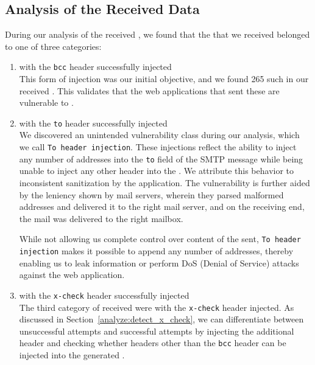 \subsection{Analysis of the Received \Email Data}
During our analysis of the received \emails, we found that the \emails that we received belonged to one of three categories:
\begin{enumerate}
	\item \Emails with the \texttt{bcc} header successfully injected\\
	  This form of injection was our initial objective, and we found
      265 such \emails in our received \emails. This validates that the web applications that sent these \emails are vulnerable to \ehi.
	
	\item \Emails with the \texttt{to} header successfully injected\\
	We discovered an unintended vulnerability class during our analysis, which we call \texttt{To~header injection}. These injections reflect the ability to inject any number of \email addresses into the \texttt{to} field of the SMTP message while being unable to inject any other header into the \emails. We attribute this behavior to inconsistent sanitization by the application. 
	The vulnerability is further aided by the leniency shown by mail servers, wherein they parsed malformed \email addresses and delivered it to the right mail server, and on the receiving end, the mail was delivered to the right mailbox. 
	
	While not allowing us complete control over content of the \emails sent, \texttt{To header injection} makes it possible to append any number of \email addresses, thereby enabling us to leak information or perform DoS (Denial of Service) attacks against the web application.
	
	\item \Emails with the \texttt{x-check} header successfully injected\\
    The third category of \emails received were \emails with the \texttt{x-check} header injected. As discussed in Section~\ref{analyze:detect_x_check}, 
    we can differentiate between unsuccessful attempts and successful attempts by injecting the additional header and checking whether headers other than the \texttt{bcc} header can be injected into the generated \email. 
\end{enumerate}

